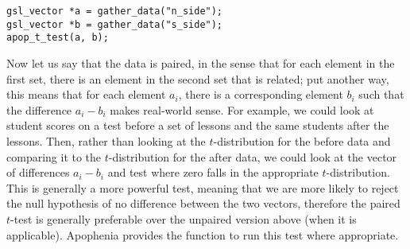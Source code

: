 \begin{lstlisting}
gsl_vector *a = gather_data("n_side");
gsl_vector *b = gather_data("s_side");
apop_t_test(a, b);
\end{lstlisting}

Now let us say that the data is paired, in the sense that for each
element in the first set, there is an element in the second set that is
related; put another way, this means that for each element $a_i$, there
is a corresponding element $b_i$ such that the difference $a_i - b_i$
makes real-world sense. For example, we could look at student scores on
a test before a set of lessons and the same students after the lessons.
Then, rather than looking at the $t$-distribution for the before data
and comparing it to the $t$-distribution for the after data, we could
look at the vector of differences $a_i - b_i$ and test where zero falls
in the appropriate $t$-distribution. This is generally a more powerful test,
meaning that we are more likely to reject the null hypothesis of no
difference between the two vectors, therefore the paired $t$-test is
generally preferable over the unpaired version above (when it is
applicable). Apophenia provides the 
function to run this test where appropriate.

